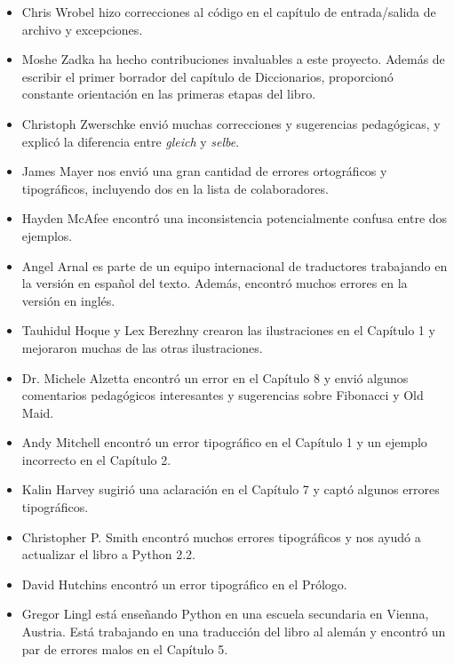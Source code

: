 \documentclass[10pt]{book}
\begin{document}
\begin{itemize}
\item Chris Wrobel hizo correcciones al código en el capítulo de
entrada/salida de archivo y excepciones.

\item Moshe Zadka ha hecho contribuciones invaluables a este proyecto.
Además de escribir el primer borrador del capítulo de Diccionarios,
proporcionó constante orientación en las primeras etapas del libro.

\item Christoph Zwerschke envió muchas correcciones y
sugerencias pedagógicas, y explicó la diferencia entre {\em gleich}
y {\em selbe}.

\item James Mayer nos envió una gran cantidad de errores ortográficos
y tipográficos, incluyendo dos en la lista de colaboradores.

\item Hayden McAfee encontró una inconsistencia potencialmente confusa
entre dos ejemplos.

\item Angel Arnal es parte de un equipo internacional de traductores
trabajando en la versión en español del texto.  Además, encontró muchos
errores en la versión en inglés.

\item Tauhidul Hoque y Lex Berezhny crearon las ilustraciones
en el Capítulo 1 y mejoraron muchas de las otras ilustraciones.

\item Dr. Michele Alzetta encontró un error en el Capítulo 8 y envió
algunos comentarios pedagógicos interesantes y sugerencias sobre Fibonacci
y Old Maid.

\item Andy Mitchell encontró un error tipográfico en el Capítulo 1 y un ejemplo
incorrecto en el Capítulo 2.

\item Kalin Harvey sugirió una aclaración en el Capítulo 7 y
captó algunos errores tipográficos.

\item Christopher P. Smith encontró muchos errores tipográficos y nos ayudó a
actualizar el libro a Python 2.2.

\item David Hutchins encontró un error tipográfico en el Prólogo.

\item Gregor Lingl está enseñando Python en una escuela secundaria en Vienna,
Austria.  Está trabajando en una traducción del libro al alemán
y encontró un par de errores malos en el Capítulo 5.


\end{itemize}
\end{document}
